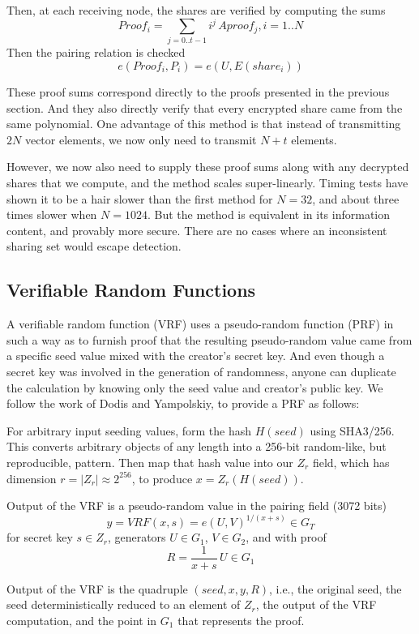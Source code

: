\documentclass{yellowpaper}
\begin{document}
Then, at each receiving node, the shares are verified by computing the sums
$$ Proof_i = \sum_{j=0..t-1} i^j\, Aproof_j, i = 1..N$$
Then the pairing relation is checked
$$e(Proof_i, P_i) = e(U,E(share_i))$$

These proof sums correspond directly to the proofs presented in the previous section. And they also directly verify that every encrypted share came from the same polynomial. One advantage of this method is that instead of transmitting $2 N$ vector elements, we now only need to transmit $N+t$ elements.

However, we now also need to supply these proof sums along with any decrypted shares that we compute, and the method scales super-linearly. Timing tests have shown it to be a hair slower than the first method for $N=32$, and about three times slower when $N=1024$. But the method is equivalent in its information content, and provably more secure. There are no cases where an inconsistent sharing set would escape detection.
\subsection{Verifiable Random Functions}
A verifiable random function (VRF)\cite{vrf2} uses a pseudo-random function (PRF) in such a way as to furnish proof that the resulting pseudo-random value came from a specific seed value mixed with the creator's secret key. And even though a secret key was involved in the generation of randomness, anyone can duplicate the calculation by knowing only the seed value and creator's public key. We follow the work of Dodis and Yampolskiy\cite{vrf}, to provide a PRF as follows:

For arbitrary input seeding values, form the hash $H(seed)$ using SHA3/256. This converts arbitrary objects of any length into a 256-bit random-like, but reproducible, pattern. Then map that hash value into our $Z_r$ field, which has dimension $r = |Z_r| \approx 2^{256}$, to produce $x = Z_r(H(seed))$.

Output of the VRF is a pseudo-random value in the pairing field (3072 bits) 
$$y = VRF(x, s) = e(U,V)^{1/(x + s)} \in G_T$$ 
for secret key $s \in Z_r$,  generators $U \in G_1$, $V \in G_2$, and with proof 
$$R = \frac{1}{x+s}\,U \in G_1$$ 

Output of the VRF is the quadruple $(seed, x, y, R)$, i.e., the original seed, the seed deterministically reduced to an element of $Z_r$, the output of the VRF computation, and the point in $G_1$ that represents the proof.
\end{document}
